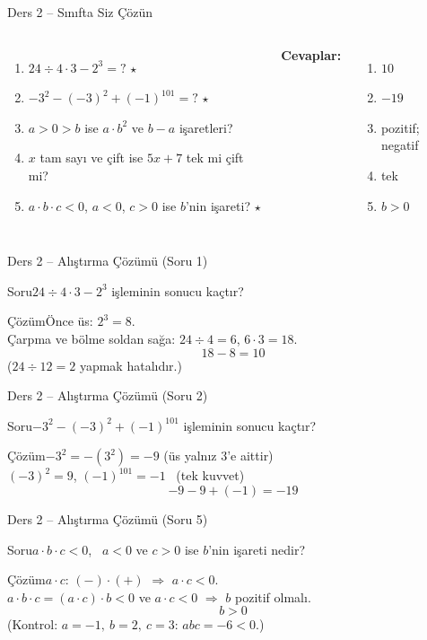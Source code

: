 \documentclass[aspectratio=169,11pt,handout]{beamer}
\newcommand{\soru}[3]{%
\begin{frame}{#1}
  \begin{block}{Soru}\large #2\end{block}
  \pause
  \begin{exampleblock}{Çözüm}\large #3\end{exampleblock}
\end{frame}}
\begin{document}
\begin{frame}{Ders 2 -- Sınıfta Siz Çözün}
\begin{columns}[t]
\begin{enumerate}
\item \(24\div 4\cdot 3-2^3=?\) \(\star\)
\item \(-3^2-(-3)^2+(-1)^{101}=?\) \(\star\)
\item \(a>0>b\) ise \(a\cdot b^2\) ve \(b-a\) işaretleri?
\item \(x\) tam sayı ve çift ise \(5x+7\) tek mi çift mi?
\item \(a\cdot b\cdot c<0\), \(a<0\), \(c>0\) ise \(b\)'nin işareti? \(\star\)
\end{enumerate}
\pause
\textbf{Cevaplar:}
\begin{enumerate}
\item \(10\)
\item \(-19\)
\item pozitif; negatif
\item tek
\item \(b>0\)
\end{enumerate}
\end{columns}
\vspace{4pt}{\footnotesize \(\star\) işaretli soruların adım adım çözümü sonraki slaytlardadır.}
\end{frame}

\soru{Ders 2 -- Alıştırma Çözümü (Soru 1)}
{\(24\div 4\cdot 3-2^3\) işleminin sonucu kaçtır?}
{Önce üs: \(2^3=8\).\\[3pt]
Çarpma ve bölme soldan sağa: \(24\div 4=6\), \quad \(6\cdot 3=18\).
\[18-8=10\]
(\(24\div 12=2\) yapmak hatalıdır.)}

\soru{Ders 2 -- Alıştırma Çözümü (Soru 2)}
{\(-3^2-(-3)^2+(-1)^{101}\) işleminin sonucu kaçtır?}
{\(-3^2=-(3^2)=-9\) \quad (üs yalnız \(3\)'e aittir)\\[3pt]
\((-3)^2=9\), \quad \((-1)^{101}=-1\) \ (tek kuvvet)
\[-9-9+(-1)=-19\]}

\soru{Ders 2 -- Alıştırma Çözümü (Soru 5)}
{\(a\cdot b\cdot c<0\), \ \(a<0\) ve \(c>0\) ise \(b\)'nin işareti nedir?}
{\(a\cdot c\): \((-)\cdot(+)\) \(\Rightarrow\) \(a\cdot c<0\).\\[3pt]
\(a\cdot b\cdot c=(a\cdot c)\cdot b<0\) ve \(a\cdot c<0\) \(\Rightarrow\) \(b\) pozitif olmalı.
\[b>0\]
(Kontrol: \(a=-1,\ b=2,\ c=3\): \(abc=-6<0\).)}

\end{document}
